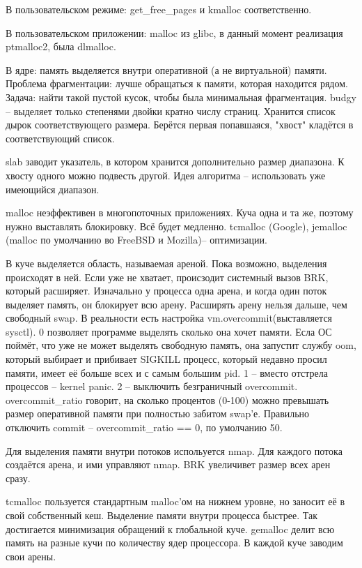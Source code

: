 \documentclass[a4paper,10pt]{article}
\begin{document}
В пользовательском режиме:
get\_free\_pages и kmalloc соответственно.

В пользовательском приложении: 
malloc из glibc, в данный момент реализация ptmalloc2, была dlmalloc.

В ядре:
память выделяется внутри оперативной (а не виртуальной) памяти. 
Проблема фрагментации: лучше обращаться к памяти, которая находится рядом.
Задача: найти такой пустой кусок, чтобы была минимальная фрагментация.
budgy -- выделяет только степенями двойки кратно числу страниц.
Хранится список дырок соответствующего размера. Берётся первая попавшаяся, "хвост" кладётся в соответствующий список.

slab заводит указатель, в котором хранится дополнительно размер диапазона. К хвосту одного можно подвесть другой.
Идея алгоритма -- использовать уже имеющийся диапазон.

malloc неэффективен в многопоточных приложениях. Куча одна и та же, поэтому нужно выставлять блокировку. Всё будет медленно.
tcmalloc (Google), jemalloc (malloc по умолчанию во FreeBSD и Mozilla)-- оптимизации.

В куче выделяется область, называемая ареной. Пока возможно, выделения происходят в ней. Если уже не хватает, происзодит системный вызов BRK, который расширяет.
Изначально у процесса одна арена, и когда один поток выделяет память, он блокирует всю арену. 
Расширять арену нельзя дальше, чем свободный swap. В реальности есть настройка vm.overcommit(выставляется sysctl).
0 позволяет программе выделять сколько она хочет памяти. Есла ОС поймёт, что уже не может выделять свободную память, она запустит службу oom, который выбирает и прибивает SIGKILL процесс, который недавно просил памяти, имеет её больше всех и с самым большим pid.
1 -- вместо отстрела процессов -- kernel panic.
2 -- выключить безграничный overcommit. overcommit\_ratio говорит, на сколько процентов (0-100) можно превышать размер оперативной памяти при полностью забитом swap'е.
Правильно отключить commit -- overcommit\_ratio == 0, по умолчанию 50.

Для выделения памяти внутри потоков испольуется nmap. Для каждого потока создаётся арена, и ими управляют nmap. BRK увеличивет размер всех арен сразу.


tcmalloc пользуется стандартным malloc'ом на нижнем уровне, но заносит её в свой собственный кеш. Выделение памяти внутри процесса быстрее. Так достигается минимизация обращений к глобальной куче.
gemalloc делит всю память на разные кучи по количеству ядер процессора. В каждой куче заводим свои арены.
\end{document}
